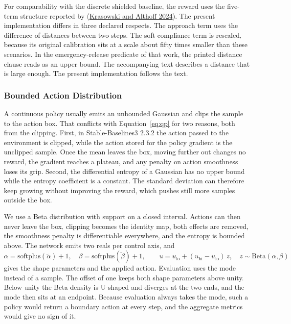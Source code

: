 \documentclass[10pt,letterpaper]{article}
\newcommand{\citl}[2]{(\hyperlink{ref:#1}{#2})}
\begin{document}
For comparability with the discrete shielded baseline, the reward uses the five-term
structure reported by \citl{krasowski2024}{Krasowski and Althoff 2024}. The present
implementation differs in three declared respects. The approach term uses the difference
of distances between two steps. The soft compliance term is rescaled, because its
original calibration sits at a scale about fifty times smaller than these scenarios. In the emergency-release predicate of that work, the printed distance clause reads as an
upper bound. The accompanying text describes a distance that is large enough. The
present implementation follows the text.

\subsubsection{Bounded Action Distribution}

A continuous policy usually emits an unbounded Gaussian and clips the sample to the
action box. That conflicts with Equation~\eqref{eq:qp} for two reasons, both from the
clipping. First, in Stable-Baselines3 2.3.2 the action passed to the environment is clipped, while
the action stored for the policy gradient is the unclipped sample. Once the mean leaves the box, moving
further out changes no reward, the
gradient reaches a plateau, and any penalty on action smoothness loses its grip. Second, the differential entropy of a Gaussian has no upper bound while the entropy
coefficient is a constant. The standard deviation can therefore keep growing without improving the reward, which
pushes still more samples outside the box.

We use a Beta distribution with support on a closed interval. Actions can then never leave the box, clipping becomes the identity map, both effects
are removed, the smoothness penalty is differentiable everywhere, and the entropy is
bounded above. The network emits two reals
per control axis, and
\begin{equation}
 \alpha=\mathrm{softplus}(\tilde\alpha)+1,\quad \beta=\mathrm{softplus}(\tilde\beta)+1,\qquad
 u=u_{\mathrm{lo}}+(u_{\mathrm{hi}}-u_{\mathrm{lo}})\,z,\quad z\sim\mathrm{Beta}(\alpha,\beta)
 \label{eq:beta}
\end{equation}
gives the shape parameters and the applied action. Evaluation uses the mode instead of a
sample. The offset of one keeps both shape parameters above unity. Below unity the Beta density
is U-shaped and diverges at the two ends, and the mode then sits at an endpoint. Because
evaluation always takes the mode, such a policy would return a boundary action at every
step, and the aggregate metrics would give no sign of it.
\end{document}
